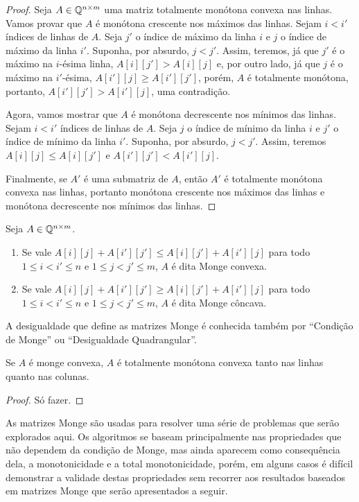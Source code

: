 \begin{proof}
Seja $A \in \mathbb{Q}^{n \times m}$ uma matriz totalmente monótona convexa nas linhas. Vamos provar que $A$ é monótona crescente nos máximos das linhas. Sejam $i < i'$ índices de linhas de $A$. Seja $j'$ o índice de máximo da linha $i$ e $j$ o índice de máximo da linha $i'$. Suponha, por absurdo, $j < j'$. Assim, teremos, já que $j'$ é o máximo na $i$-ésima linha, $A[i][j'] > A[i][j]$ e, por outro lado, já que $j$ é o máximo na $i'$-ésima, $A[i'][j] \geq A[i'][j']$, porém, $A$ é totalmente monótona, portanto, $A[i'][j'] > A[i'][j]$, uma contradição.  

Agora, vamos mostrar que $A$ é monótona decrescente nos mínimos das linhas. Sejam $i < i'$ índices de linhas de $A$. Seja $j$ o índice de mínimo da linha $i$ e $j'$ o índice de mínimo da linha $i'$. Suponha, por absurdo, $j < j'$. Assim, teremos $A[i][j] \leq A[i][j']$ e $A[i'][j'] < A[i'][j]$.

Finalmente, se $A'$ é uma submatriz de $A$, então $A'$ é totalmente monótona convexa nas linhas, portanto monótona crescente nos máximos das linhas e monótona decrescente nos mínimos das linhas.
\end{proof}

\begin{defi} \label{defi:MatrizMonge}
Seja $A \in \mathbb{Q}^{n \times m}$.
    \begin{enumerate}
        \item Se vale $A[i][j] + A[i'][j'] \leq A[i][j'] + A[i'][j]$ para todo $1 \leq i < i' \leq n$ e $1 \leq j < j' \leq m$, $A$ é dita Monge convexa.
        \item Se vale $A[i][j] + A[i'][j'] \geq A[i][j'] + A[i'][j]$ para todo $1 \leq i < i' \leq n$ e $1 \leq j < j' \leq m$, $A$ é dita Monge côncava.
    \end{enumerate}
\end{defi}

A desigualdade que define as matrizes Monge é conhecida também por ``Condição de Monge'' ou ``Desigualdade Quadrangular''.

\begin{theo}
Se $A$ é monge convexa, $A$ é totalmente monótona convexa tanto nas linhas quanto nas colunas.
\end{theo}

\begin{proof}
Só fazer.
\end{proof}

As matrizes Monge são usadas para resolver uma série de problemas que serão explorados aqui. Os algoritmos se baseam principalmente nas propriedades que não dependem da condição de Monge, mas ainda aparecem como consequência dela, a monotonicidade e a total monotonicidade, porém, em alguns casos é difícil demonstrar a validade destas propriedades sem recorrer aos resultados baseados em matrizes Monge que serão apresentados a seguir.  

